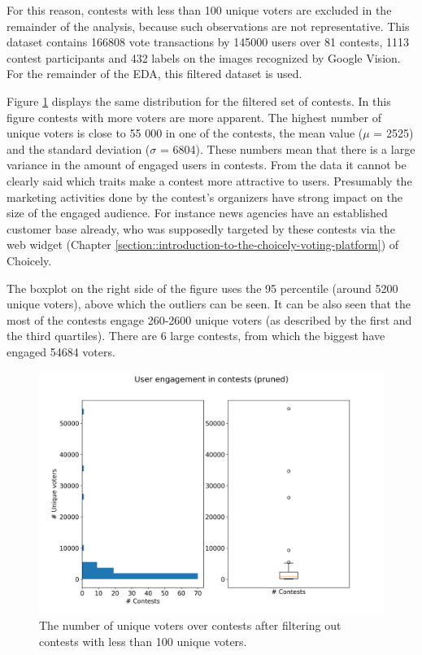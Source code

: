     For this reason, contests with less than 100 unique voters are excluded in the remainder of the analysis, because such observations are not representative. This dataset contains 166808 vote transactions by 145000 users over 81 contests, 1113 contest participants and 432 labels on the images recognized by Google Vision. For the remainder of the EDA, this filtered dataset is used.

    Figure \ref{user_engagement_in_contests-pruned} displays the same distribution for the filtered set of contests. In this figure contests with more voters are more apparent. The highest number of unique voters is close to 55 000 in one of the contests, the mean value ($\mu$ = 2525) and the standard deviation ($\sigma$ = 6804). These numbers mean that there is a large variance in the amount of engaged users in contests. From the data it cannot be clearly said which traits make a contest more attractive to users. Presumably the marketing activities done by the contest's organizers have strong impact on the size of the engaged audience. For instance news agencies have an established customer base already, who was supposedly targeted by these contests via the web widget (Chapter \ref{section::introduction-to-the-choicely-voting-platform}) of Choicely. 
    
    The boxplot on the right side of the figure uses the 95 percentile (around 5200 unique voters), above which the outliers can be seen. It can be also seen that the most of the contests engage 260-2600 unique voters (as described by the first and the third quartiles). There are 6 large contests, from which the biggest have engaged 54684 voters. 

    \begin{figure}[h] 
        \begin{center}
            \includegraphics[width=1\textwidth]{Images/user_engagement_in_contests-pruned.png}
            \caption{The number of unique voters over contests after filtering out contests with less than 100 unique voters.}
            \label{user_engagement_in_contests-pruned}
        \end{center}
    \end{figure}
    
